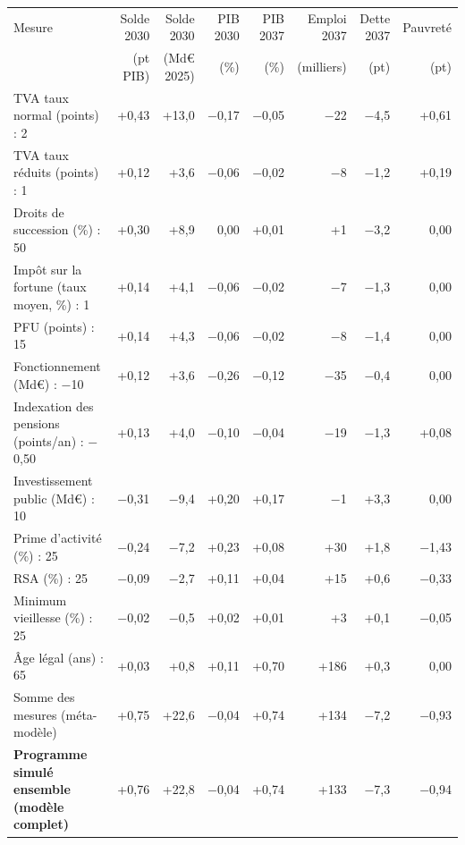 \begin{tabular}{p{4.6cm}rrrrrrr}
\toprule
Mesure & Solde 2030 & Solde 2030 & PIB 2030 & PIB 2037 & Emploi 2037 & Dette 2037 & Pauvreté \\
 & (pt PIB) & (Md€ 2025) & (\%) & (\%) & (milliers) & (pt) & (pt) \\
\midrule
TVA taux normal (points) : 2 & +0{,}43 & +13{,}0 & $-$0{,}17 & $-$0{,}05 & $-$22 & $-$4{,}5 & +0{,}61 \\
TVA taux réduits (points) : 1 & +0{,}12 & +3{,}6 & $-$0{,}06 & $-$0{,}02 & $-$8 & $-$1{,}2 & +0{,}19 \\
Droits de succession (\%) : 50 & +0{,}30 & +8{,}9 & 0{,}00 & +0{,}01 & +1 & $-$3{,}2 & 0{,}00 \\
Impôt sur la fortune (taux moyen, \%) : 1 & +0{,}14 & +4{,}1 & $-$0{,}06 & $-$0{,}02 & $-$7 & $-$1{,}3 & 0{,}00 \\
PFU (points) : 15 & +0{,}14 & +4{,}3 & $-$0{,}06 & $-$0{,}02 & $-$8 & $-$1{,}4 & 0{,}00 \\
Fonctionnement (Md€) : $-$10 & +0{,}12 & +3{,}6 & $-$0{,}26 & $-$0{,}12 & $-$35 & $-$0{,}4 & 0{,}00 \\
Indexation des pensions (points/an) : $-$0{,}50 & +0{,}13 & +4{,}0 & $-$0{,}10 & $-$0{,}04 & $-$19 & $-$1{,}3 & +0{,}08 \\
Investissement public (Md€) : 10 & $-$0{,}31 & $-$9{,}4 & +0{,}20 & +0{,}17 & $-$1 & +3{,}3 & 0{,}00 \\
Prime d'activité (\%) : 25 & $-$0{,}24 & $-$7{,}2 & +0{,}23 & +0{,}08 & +30 & +1{,}8 & $-$1{,}43 \\
RSA (\%) : 25 & $-$0{,}09 & $-$2{,}7 & +0{,}11 & +0{,}04 & +15 & +0{,}6 & $-$0{,}33 \\
Minimum vieillesse (\%) : 25 & $-$0{,}02 & $-$0{,}5 & +0{,}02 & +0{,}01 & +3 & +0{,}1 & $-$0{,}05 \\
Âge légal (ans) : 65 & +0{,}03 & +0{,}8 & +0{,}11 & +0{,}70 & +186 & +0{,}3 & 0{,}00 \\
\midrule
Somme des mesures (méta-modèle) & +0{,}75 & +22{,}6 & $-$0{,}04 & +0{,}74 & +134 & $-$7{,}2 & $-$0{,}93 \\
\textbf{Programme simulé ensemble (modèle complet)} & +0{,}76 & +22{,}8 & $-$0{,}04 & +0{,}74 & +133 & $-$7{,}3 & $-$0{,}94 \\
\bottomrule
\end{tabular}
